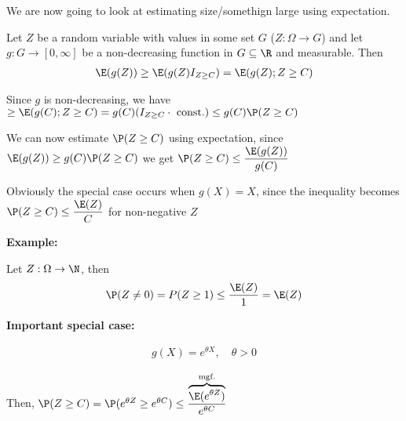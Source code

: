 \par\bigskip
\noindent We are now going to look at estimating size/somethign large using expectation.
\par\bigskip
\begin{theo}{}
  Let $Z$ be a random variable with values in some set $G$ ($Z:\Omega\to G$) and let $g:G\to[0,\infty]$ be a non-decreasing function in $G\subseteq\R$ and measurable. Then
  \begin{equation*}
    \begin{gathered}
      \E(g(Z))\geq \E(g(Z)I_{Z\geq C}) = \E(g(Z);{Z\geq C})
    \end{gathered}
  \end{equation*}
\end{theo}
\par\bigskip
\begin{prf}{}
  Since $g$ is non-decreasing, we have $\geq \E(g(C);{Z\geq C}) = g(C)(I_{Z\geq C}\cdot\text{ const.})\leq g(C)\P(Z\geq C)$
  \par\bigskip
  \noindent We can now estimate $\P(Z\geq C)$ using expectation, since $\E(g(Z))\geq g(C)\P(Z\geq C)$ we get $\P(Z\geq C)\leq \dfrac{\E(g(Z))}{g(C)}$
\end{prf}
\par\bigskip
\noindent Obviously the special case occurs when $g(X) = X$, since the inequality becomes $\P(Z\geq C)\leq \dfrac{\E(Z)}{C}$ for non-negative $Z$
\par\bigskip
\noindent\textbf{Example:}\par
\noindent Let $Z:\Omega\to\N$, then
\begin{equation*}
  \begin{gathered}
    \P(Z\neq0) = P(Z\geq1)\leq \dfrac{\E(Z)}{1} = \E(Z)
  \end{gathered}
\end{equation*}
\par\bigskip
\noindent\textbf{Important special case:}\par
\begin{equation*}
  \begin{gathered}
    g(X) = e^{\theta X},\quad \theta>0
  \end{gathered}
\end{equation*}\par
\noindent Then, $\P(Z\geq C) = \P(e^{\theta Z}\geq e^{\theta C})\leq \dfrac{\overbrace{\E(e^{\theta Z})}^{\text{mgf.}}}{e^{\theta C}}$
\par\bigskip
